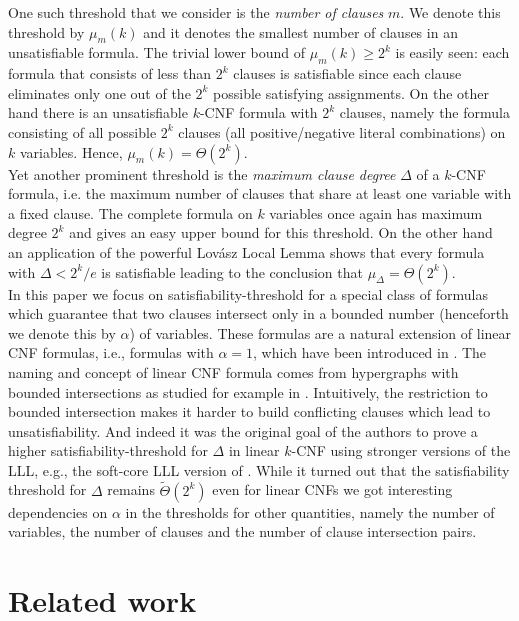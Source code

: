 \documentclass[11pt,letterpaper]{article}
\begin{document}
One such threshold that we consider is the \emph{number of clauses} $m$. We denote this threshold by $\mu_m(k)$ and it denotes the smallest number of clauses in an unsatisfiable formula. The trivial lower bound of $\mu_m(k)\geq 2^k$ is easily seen: each formula that consists of less than $2^k$ clauses is satisfiable since each clause eliminates only one out of the $2^k$ possible satisfying assignments. On the other hand there is an unsatisfiable $k$-CNF formula with $2^k$ clauses, namely the formula consisting of all possible $2^k$ clauses (all positive/negative literal combinations) on $k$ variables. Hence, $\mu_m(k)=\Theta(2^k)$.\\ 

Yet another prominent threshold is the \emph{maximum clause degree} $\Delta$ of a $k$-CNF formula, i.e. the maximum number of clauses that share at least one variable with a fixed clause. The complete formula on $k$ variables once again has maximum degree $2^k$ and gives an easy upper bound for this threshold. On the other hand an application of the powerful Lov\'asz Local Lemma \cite{ErdoesLovasz} shows that every formula with $\Delta <  2^k/e$ is satisfiable leading to the conclusion that $\mu_{\Delta} = \Theta(2^k)$.\\


In this paper we focus on satisfiability-threshold for a special class of formulas which guarantee that two clauses intersect only in a bounded number (henceforth we denote this by $\alpha$) of variables. These formulas are a natural extension of linear CNF formulas, i.e., formulas with $\alpha = 1$, which have been introduced in \cite{porschen2009linear}. The naming and concept of linear CNF formula comes from hypergraphs with bounded intersections as studied for example in \cite{ErdoesLovasz}. Intuitively, the restriction to bounded intersection makes it harder to build conflicting clauses which lead to unsatisfiability. And indeed it was the original goal of the authors to prove a higher satisfiability-threshold for $\Delta$ in linear $k$-CNF using stronger versions of the LLL, e.g., the soft-core LLL version of \cite{scott2005repulsive}. While it turned out that the satisfiability threshold for $\Delta$ remains $\tilde{\Theta}(2^k)$ even for linear CNFs we got interesting dependencies on $\alpha$ in the thresholds for other quantities, namely the number of variables, the number of clauses and the number of clause intersection pairs.




\section{Related work}
\end{document}
